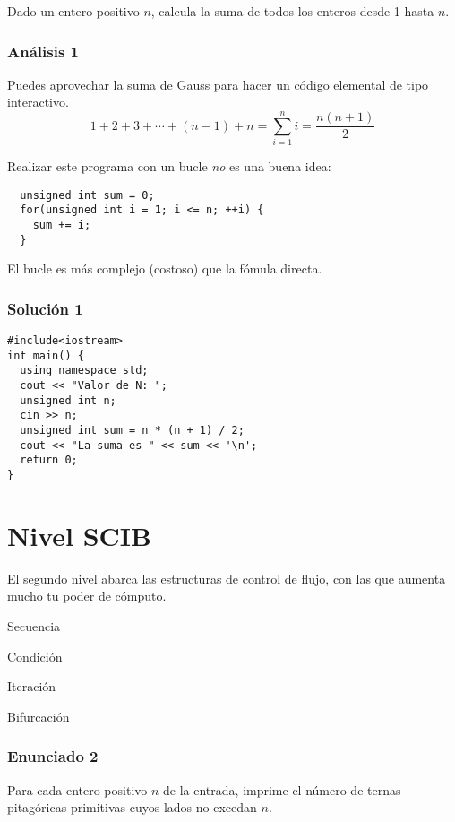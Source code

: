 \documentclass[10pt,letterpaper,twocolumn,spanish]{article}
\begin{document}
Dado un entero positivo $n$, calcula la suma de todos los enteros desde 1 hasta $n$.

\subsubsection*{Análisis 1}

Puedes aprovechar la suma de Gauss para hacer un código elemental de tipo interactivo.
\[1+2+3+\cdots+(n-1)+n=\sum_{i=1}^{n}i=\frac{n(n+1)}{2}\]

Realizar este programa con un bucle \textit{no} es una buena idea:

\begin{verbatim}
  unsigned int sum = 0;
  for(unsigned int i = 1; i <= n; ++i) {
    sum += i;
  }
\end{verbatim}

El bucle es más complejo (costoso) que la fómula directa.

\subsubsection*{Solución 1}

\begin{verbatim}
#include<iostream>
int main() {
  using namespace std;
  cout << "Valor de N: ";
  unsigned int n;
  cin >> n;
  unsigned int sum = n * (n + 1) / 2;
  cout << "La suma es " << sum << '\n';
  return 0;
}
\end{verbatim}

\section*{Nivel SCIB}

El segundo nivel abarca las estructuras de control de flujo, con las que aumenta mucho tu poder de cómputo.

\begin{compactitem}
\item Secuencia
\item Condición
\item Iteración
\item Bifurcación
\end{compactitem}

\subsubsection*{Enunciado 2}

Para cada entero positivo $n$ de la entrada, imprime el número de ternas pitagóricas primitivas cuyos lados no excedan $n$.
\end{document}
